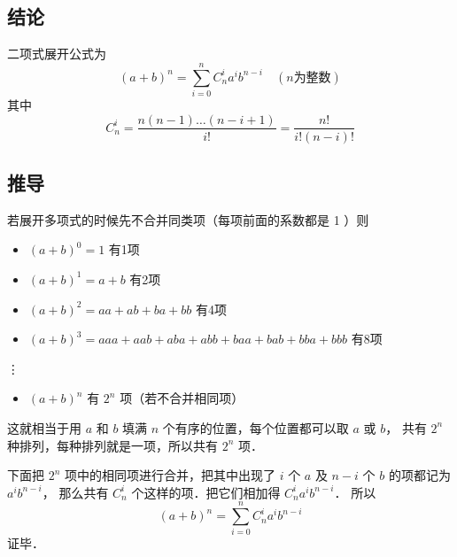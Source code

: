 
\subsection{结论}
二项式展开公式为
\begin{equation}
(a + b)^n = \sum_{i = 0}^n  C_n^i a^i b^{n - i} \quad (n \text{为整数})
\end{equation}
其中
\begin{equation}
C_n^i = \frac{n(n - 1)\dots (n - i + 1)}{i!} = \frac{n!}{i!(n - i)!}
\end{equation}

\subsection{推导}
若展开多项式的时候先不合并同类项（每项前面的系数都是 1 ）则
\begin{itemize}
\item $(a + b)^0 = 1$ 有1项
\item $(a + b)^1 = a + b$ 有2项
\item $(a + b)^2 = aa + ab + ba + bb$ 有4项
\item $(a + b)^3 = aaa + aab + aba + abb + baa + bab + bba + bbb$ 有8项
\end{itemize}
\qquad \vdots
\begin{itemize}
\item $(a + b)^n$ 有 $2^n$ 项（若不合并相同项）
\end{itemize}

这就相当于用 $a$ 和 $b$ 填满 $n$ 个有序的位置，每个位置都可以取 $a$ 或 $b$， 共有 $2^n$ 种排列，每种排列就是一项，所以共有 $2^n$ 项．

下面把 $2^n$ 项中的相同项进行合并，把其中出现了 $i$ 个 $a$ 及 $n-i$ 个 $b$ 的项都记为 $a^i b^{n-i}$， 那么共有 $C_n^i$ 个这样的项．把它们相加得 $C_n^i a^i b^{n-i}$． 所以
\begin{equation}
(a + b)^n = \sum_{i = 0}^n  C_n^i a^i b^{n - i}
\end{equation}
证毕．